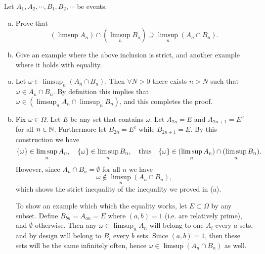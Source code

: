 \begin{problem}
	Let $ A_1,A_2,\cdots, B_1,B_2,\cdots $ be events.
	\begin{enumerate}[(a)]
		\item Prove that 
		\[ (\limsup A_n) \cap (\limsup_n B_n) \supseteq \limsup_n (A_n\cap B_n). \]
		\item Give an example where the above inclusion is strict, and another example where it holds with equality.
	\end{enumerate}
\end{problem}
\begin{solution}
	\begin{enumerate}[(a)]
		\item Let $ \omega \in \limsup_n (A_n \cap B_n) $. Then $ \forall N > 0 $ there exists $ n > N $ such that $ \omega \in A_n\cap B_n $. By definition this implies that $ \omega \in (\limsup_n A_n \cap \limsup_n B_n) $, and this completes the proof.
		
		\item Fix $ \omega \in \Omega $. Let $ E $ be any set that contains $ \omega $. Let $ A_{2n} = E $ and $ A_{2n+1} = E^c $ for all $ n \in \mathbb{N} $. Furthermore let $ B_{2n} = E^c $ while $ B_{2n+1} = E $. By this construction we have
		\[ \{\omega\} \in \limsup_n A_n, \quad \{\omega\} \in \limsup_n B_n,\quad \text{thus}\quad \{\omega\} \in (\limsup_n A_n) \cap (\limsup_n B_n). \]
		However, since $ A_n \cap B_n = \emptyset $ for all $ n $ we have
		\[ \omega \notin \limsup_n (A_n \cap B_n), \]
		which shows the strict inequality of the inequality we proved in (a).
		
		To show an example which which the equality works, let $ E\subset\Omega $ by any subset. Define $ B_{bn} = A_{an} = E $ where $ (a,b)=1 $ (i.e. are relatively prime), and $ \emptyset $ otherwise. Then any $ \omega \in \limsup_n A_n $ will belong to one $ A_i $ every $ a $ sets, and by design will belong to $ B_i $ every $ b $ sets. Since $ (a,b)=1 $, then these sets will be the same infinitely often, hence $ \omega \in \limsup(A_n\cap B_n) $ as well.
	\end{enumerate}
\end{solution}

